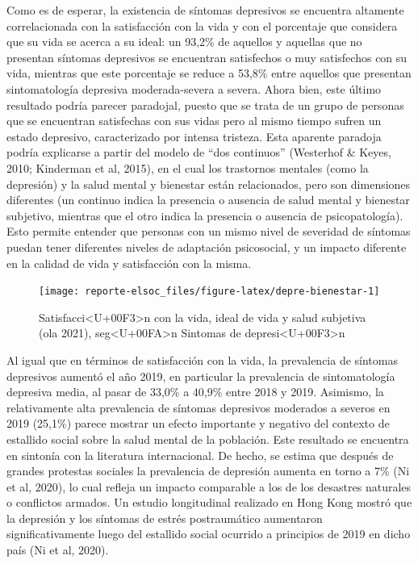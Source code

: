 \documentclass[
  12pt,
]{book}
\begin{document}
Como es de esperar, la existencia de síntomas depresivos se encuentra altamente correlacionada con la satisfacción con la vida y con el porcentaje que considera que su vida se acerca a su ideal: un 93,2\% de aquellos y aquellas que no presentan síntomas depresivos se encuentran satisfechos o muy satisfechos con su vida, mientras que este porcentaje se reduce a 53,8\% entre aquellos que presentan sintomatología depresiva moderada-severa a severa. Ahora bien, este último resultado podría parecer paradojal, puesto que se trata de un grupo de personas que se encuentran satisfechas con sus vidas pero al mismo tiempo sufren un estado depresivo, caracterizado por intensa tristeza. Esta aparente paradoja podría explicarse a partir del modelo de ``dos continuos'' (Westerhof \& Keyes, 2010; Kinderman et al, 2015), en el cual los trastornos mentales (como la depresión) y la salud mental y bienestar están relacionados, pero son dimensiones diferentes (un continuo indica la presencia o ausencia de salud mental y bienestar subjetivo, mientras que el otro indica la presencia o ausencia de psicopatología). Esto permite entender que personas con un mismo nivel de severidad de síntomas puedan tener diferentes niveles de adaptación psicosocial, y un impacto diferente en la calidad de vida y satisfacción con la misma.

\begin{figure}

{\centering \texttt{[image: reporte-elsoc\_files/figure-latex/depre-bienestar-1]} 

}

\caption{Satisfacci<U+00F3>n con la vida, ideal de vida y salud subjetiva (ola 2021), seg<U+00FA>n Sintomas de depresi<U+00F3>n}\label{fig:depre-bienestar}
\end{figure}

Al igual que en términos de satisfacción con la vida, la prevalencia de síntomas depresivos aumentó el año 2019, en particular la prevalencia de sintomatología depresiva media, al pasar de 33,0\% a 40,9\% entre 2018 y 2019. Asimismo, la relativamente alta prevalencia de síntomas depresivos moderados a severos en 2019 (25,1\%) parece mostrar un efecto importante y negativo del contexto de estallido social sobre la salud mental de la población. Este resultado se encuentra en sintonía con la literatura internacional. De hecho, se estima que después de grandes protestas sociales la prevalencia de depresión aumenta en torno a 7\% (Ni et al, 2020), lo cual refleja un impacto comparable a los de los desastres naturales o conflictos armados. Un estudio longitudinal realizado en Hong Kong mostró que la depresión y los síntomas de estrés postraumático aumentaron significativamente luego del estallido social ocurrido a principios de 2019 en dicho país (Ni et al, 2020).
\end{document}
